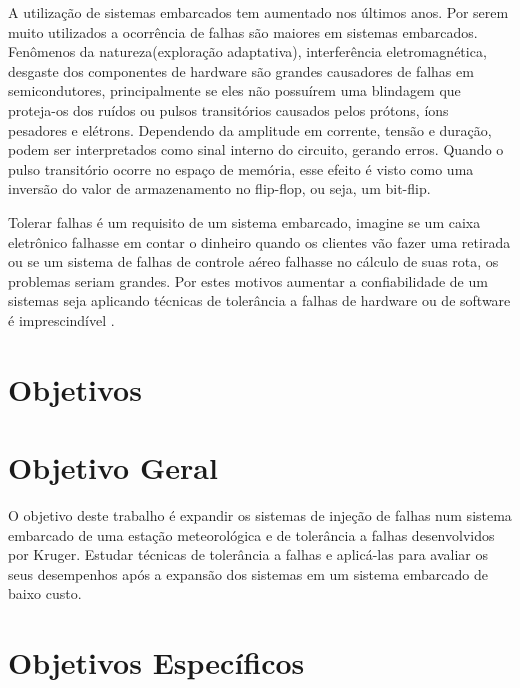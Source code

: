 \documentclass[a4paper,12pt,brazil]{ufms-cpcx}
\begin{document}
A utilização de sistemas embarcados tem aumentado nos últimos anos\cite{Chetan:2005}. Por serem muito utilizados a ocorrência de falhas são maiores em sistemas embarcados. Fenômenos da natureza(exploração adaptativa), interferência eletromagnética, desgaste dos componentes de hardware \cite{Hsueh:1997}são grandes causadores de falhas em semicondutores, principalmente se eles não possuírem uma blindagem que proteja-os dos ruídos ou pulsos transitórios causados pelos prótons, íons pesadores e elétrons. Dependendo da amplitude em corrente, tensão e duração, podem ser interpretados como sinal interno do circuito, gerando erros. Quando o pulso transitório ocorre no espaço de memória, esse efeito é visto como uma inversão do valor de armazenamento no flip-flop, ou seja, um bit-flip\cite{Ziegler:1996}. 
 
Tolerar falhas é um requisito de um sistema embarcado\cite{Thomas:1996}, imagine se um caixa eletrônico falhasse em contar o dinheiro quando os clientes vão fazer uma retirada ou se um sistema de falhas de controle aéreo falhasse no cálculo de suas rota, os problemas seriam grandes. Por estes motivos aumentar a confiabilidade de um sistemas seja aplicando técnicas de tolerância a falhas de hardware ou de software é imprescindível \cite{Nelson:1990}.

\section{Objetivos}


\section{Objetivo Geral}

O objetivo deste trabalho é expandir os sistemas de injeção de falhas num sistema embarcado de uma estação meteorológica e de tolerância a falhas desenvolvidos por Kruger\cite{Kruger:2014}. Estudar técnicas de tolerância a falhas e aplicá-las para avaliar os seus desempenhos após a expansão dos sistemas em um sistema embarcado de baixo custo. 



\section{Objetivos Específicos}
\end{document}
